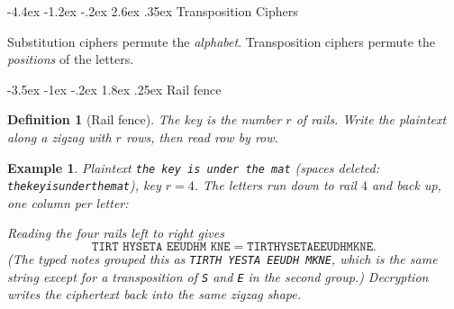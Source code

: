 \documentclass[11pt]{article}
\makeatletter
\renewcommand{\section}{\@startsection{section}{1}{\z@}%
    {-4.4ex \@plus -1.2ex \@minus -.2ex}%
    {2.6ex \@plus .35ex}%
    {\normalfont\Large\bfseries}}
\renewcommand{\subsection}{\@startsection{subsection}{2}{\z@}%
    {-3.5ex \@plus -1ex \@minus -.2ex}%
    {1.8ex \@plus .25ex}%
    {\normalfont\large\bfseries}}
\newtheorem{definition}[theorem]{Definition}
\newtheorem{example}[theorem]{Example}
\theoremstyle{remark}
\makeatother
\begin{document}
\section{Transposition Ciphers}

Substitution ciphers permute the \emph{alphabet}. Transposition ciphers
permute the \emph{positions} of the letters.

\subsection{Rail fence}

\begin{definition}[Rail fence]
The key is the number $r$ of rails. Write the plaintext along a zigzag
with $r$ rows, then read row by row.
\end{definition}

\begin{example}
Plaintext \texttt{the key is under the mat} (spaces deleted:
\texttt{thekeyisunderthemat}), key $r=4$. The letters run down to rail
$4$ and back up, one column per letter:
\begin{center}
\end{center}
Reading the four rails left to right gives
\[
    \texttt{TIRT HYSETA EEUDHM KNE}
    =
    \texttt{TIRTHYSETAEEUDHMKNE}.
\]
(The typed notes grouped this as \texttt{TIRTH YESTA EEUDH MKNE}, which
is the same string except for a transposition of \texttt{S} and
\texttt{E} in the second group.) Decryption writes the ciphertext back
into the same zigzag shape.
\end{example}
\end{document}

